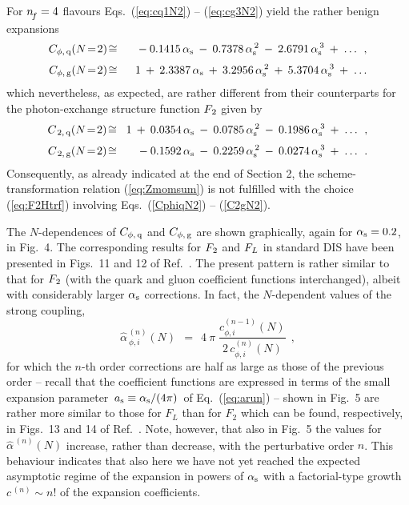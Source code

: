 \documentclass[12pt]{article}
\newcommand{\beq}{\begin{equation}}
\newcommand{\eeq}{\end{equation}}
\newcommand{\bea}{\begin{eqnarray}}
\newcommand{\eea}{\end{eqnarray}}
\newcommand{\as}{\alpha_{\rm s}}
\newcommand{\ar}{a_{\rm s}}
\begin{document}
For ${n^{}_{\! f}}=4$ flavours Eqs.~(\ref{eq:cq1N2}) -- (\ref{eq:cg3N2}) yield the rather
benign expansions
%
\bea
\label{CphiqN2}
 C_{\rm \phi,\, q}(N\!=\!2) &\!\cong\!& 
  \!\quad \:-\: 0.1415\,\as \:-\: 0.7378\,\as^{\,2}
          \:-\: 2.6791\,\as^{\,3} \:+\; \ldots
\:\: , \\[1mm]
\label{CphigN2}
 C_{\rm \phi,\, g}(N\!=\!2) &\!\cong\!&  
      1   \:+\: 2.3387\,\as \:+\: 3.2956\,\as^{\,2}
          \:+\: 5.3704\,\as^{\,3} \:+\; \ldots
\eea
%
which nevertheless, as expected, are rather different from their counterparts
for the photon-exchange structure function ${F_{\:\! 2}}$ given by \cite{Mom3loop}
%
\bea
\label{C2qN2}
 C_{\,\rm 2,\, q}(N\!=\!2) &\!\cong\!&
      1   \:+\: 0.0354\,\as \:-\: 0.0785\,\as^{\,2}
          \:-\: 0.1986\,\as^{\,3} \:+\; \ldots
\:\: , \\[1mm]
\label{C2gN2}
 C_{\,\rm 2,\, g}(N\!=\!2) &\!\cong\!&
 \!\quad \:-\: 0.1592\,\as \:-\: 0.2259\,\as^{\,2}
         \:-\: 0.0274\,\as^{\,3} \:+\; \ldots
\:\: .
\eea
%
Consequently, as already indicated at the end of Section 2, the 
scheme-transformation relation (\ref{eq:Zmomsum}) is not fulfilled with the 
choice (\ref{eq:F2Htrf}) involving Eqs.~(\ref{CphiqN2}) -- (\ref{C2gN2}).

The $N$-dependences of $C_{\rm \phi,\, q}$ and $C_{\rm \phi,\, g}$ are shown 
graphically, again for $\as = 0.2$, in Fig.~4. The corresponding results for 
${F_{\:\! 2}}$ and ${F_{\:\! L}}$ in standard DIS have been presented in Figs.~11 and 12 of 
Ref.~\cite{MVV6}. The present pattern is rather similar to that for ${F_{\:\! 2}}$
(with the quark and gluon coefficient functions interchanged), albeit with 
considerably larger $\as$ corrections. In fact, the $N$-dependent values
of the strong coupling,
%
\beq
\label{eq:ashat}
  \widehat{\alpha}_{\:\!\phi,i}^{\,(n)}(N) \:\: = \:\: 4\:\!\pi\;
  \frac{c_{\phi,i}^{(n-1)}(N)}{2\,c_{\phi,i}^{(n)}(N)} \:\: ,
\eeq
%
for which the $n$-th order corrections are half as large as those of the 
previous order 
-- recall that the coefficient functions are expressed in terms of the small 
expansion parameter $\,\ar\equiv\as/(4\pi)\,$ of Eq.~(\ref{eq:arun}) --
shown in Fig.~5 are rather more similar to those for $F_L$ than for $F_2$ which 
can be found, respectively, in Figs.~13 and 14 of Ref.~\cite{MVV6}. Note,
however, that also in Fig.~5 the values for $\widehat{\alpha}^{\,(n)}(N)$ 
increase, rather than decrease, with the perturbative order $n$. This behaviour
indicates that also here we have not yet reached the expected asymptotic regime 
of the expansion in powers of $\as$ with a factorial-type growth 
$c^{\,(n)} \sim n!$ of the expansion coefficients.
\end{document}
